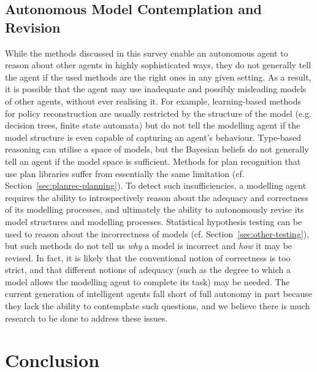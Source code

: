 \documentclass[final,1p,times,authoryear]{elsarticle}
\begin{document}
		\subsection{Autonomous Model Contemplation and Revision}

While the methods discussed in this survey enable an autonomous agent to reason about other agents in highly sophisticated ways, they do not generally tell the agent if the used methods are the right ones in any given setting. As a result, it is possible that the agent may use inadequate and possibly misleading models of other agents, without ever realising it. For example, learning-based methods for policy reconstruction are usually restricted by the structure of the model (e.g. decision trees, finite state automata) but do not tell the modelling agent if the model structure is even capable of capturing an agent's behaviour. Type-based reasoning can utilise a space of models, but the Bayesian beliefs do not generally tell an agent if the model space is sufficient. Methods for plan recognition that use plan libraries suffer from essentially the same limitation (cf. Section~\ref{sec:planrec-planning}). To detect such insufficiencies, a modelling agent requires the ability to introspectively reason about the adequacy and correctness of its modelling processes, and ultimately the ability to autonomously revise its model structures and modelling processes. Statistical hypothesis testing can be used to reason about the incorrectness of models (cf. Section~\ref{sec:other-testing}), but such methods do not tell us \emph{why} a model is incorrect and \emph{how} it may be revised. In fact, it is likely that the conventional notion of correctness is too strict, and that different notions of adequacy (such as the degree to which a model allows the modelling agent to complete its task) may be needed. The current generation of intelligent agents fall short of full autonomy in part because they lack the ability to contemplate such questions, and we believe there is much research to be done to address these issues.



	\section{Conclusion} \label{sec:conclusion}
\end{document}

